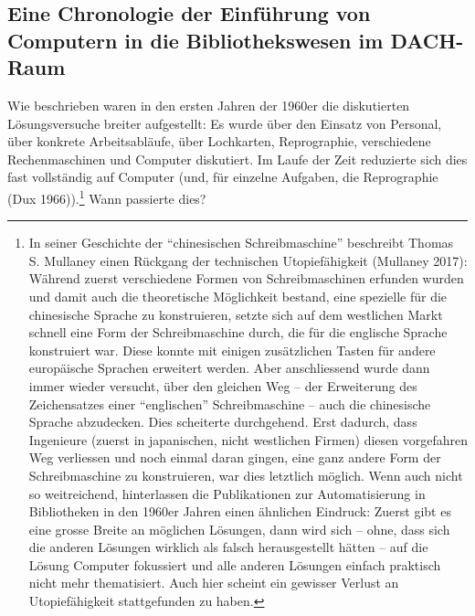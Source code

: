 \documentclass[a4paper,
fontsize=11pt,
oneside,
numbers=noperiodatend,
parskip=half-,
bibliography=totoc,
final
]{scrartcl}
\begin{document}
\hypertarget{eine-chronologie-der-einfuxfchrung-von-computern-in-die-bibliothekswesen-im-dach-raum}{%
\subsection{\texorpdfstring{Eine Chronologie der Einführung von Computern in die Bibliothekswesen im
DACH-Raum}{Eine Chronologie der Einführung von Computern in die Bibliothekswesen im DACH-Raum}}\label{eine-chronologie-der-einfuxfchrung-von-computern-in-die-bibliothekswesen-im-dach-raum}}

Wie beschrieben waren in den ersten Jahren der 1960er die diskutierten
Lösungsversuche breiter aufgestellt: Es wurde über den Einsatz von
Personal, über konkrete Arbeitsabläufe, über Lochkarten, Reprographie,
verschiedene Rechenmaschinen und Computer diskutiert. Im Laufe der Zeit
reduzierte sich dies fast vollständig auf Computer (und, für einzelne
Aufgaben, die Reprographie (Dux 1966)).\footnote{In seiner Geschichte
  der \enquote{chinesischen Schreibmaschine} beschreibt Thomas S. Mullaney einen
  Rückgang der technischen Utopiefähigkeit (Mullaney 2017): Während
  zuerst verschiedene Formen von Schreibmaschinen erfunden wurden und
  damit auch die theoretische Möglichkeit bestand, eine spezielle für
  die chinesische Sprache zu konstruieren, setzte sich auf dem
  westlichen Markt schnell eine Form der Schreibmaschine durch, die für
  die englische Sprache konstruiert war. Diese konnte mit einigen
  zusätzlichen Tasten für andere europäische Sprachen erweitert werden.
  Aber anschliessend wurde dann immer wieder versucht, über den gleichen
  Weg -- der Erweiterung des Zeichensatzes einer \enquote{englischen}
  Schreibmaschine -- auch die chinesische Sprache abzudecken. Dies
  scheiterte durchgehend. Erst dadurch, dass Ingenieure (zuerst in
  japanischen, nicht westlichen Firmen) diesen vorgefahren Weg
  verliessen und noch einmal daran gingen, eine ganz andere Form der
  Schreibmaschine zu konstruieren, war dies letztlich möglich. Wenn auch
  nicht so weitreichend, hinterlassen die Publikationen zur
  Automatisierung in Bibliotheken in den 1960er Jahren einen ähnlichen
  Eindruck: Zuerst gibt es eine grosse Breite an möglichen Lösungen,
  dann wird sich -- ohne, dass sich die anderen Lösungen wirklich als
  falsch herausgestellt hätten -- auf die Lösung Computer fokussiert und
  alle anderen Lösungen einfach praktisch nicht mehr thematisiert. Auch
  hier scheint ein gewisser Verlust an Utopiefähigkeit stattgefunden zu
  haben.} Wann passierte dies?
\end{document}
